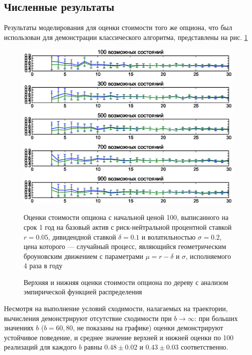 \documentclass[specialist,
               substylefile = spbu.rtx,
               subf,href,colorlinks=true, 12pt]{disser}
\begin{document}
	        \subsection{Численные результаты}
	            Результаты моделирования для оценки стоимости того же опциона, что был использован для демонстрации классического алгоритма, представлены на рис. \ref{fig:true_value_test_finite_grid}
                \begin{figure}[h]
                    \centering
                    \includegraphics[width=\textwidth]{true_value_test_finite_grid}
                    \caption{Верхняя и нижняя оценки стоимости опциона по дереву с анализом эмпирической функцией распределения}
                    \label{fig:true_value_test_finite_grid}
                    \footnotesize{Оценки стоимости опциона с начальной ценой 100, выписанного на срок 1 год на базовый актив с риск-нейтральной процентной ставкой $r = 0.05$, дивидендной ставкой $\delta = 0.1$ и волатильностью $\sigma=0.2$, цена которого --- случайный процесс, являющийся геометрическим броуновским движением с параметрами $\mu = r - \delta$ и $\sigma$, исполняемого 4 раза в году}
                \end{figure}
                Несмотря на выполнение условий сходимости, налагаемых на траектории, вычисления демонстрируют отсутствие сходимости при $b \to \infty$: при больших значениях $b$ ($b=60, 80$, не показаны на графике) оценки демонстрируют устойчивое поведение, и среднее значение верхней и нижней оценки по 100 реализаций для каждого $b$ равны $0.48\pm 0.02$ и $0.43\pm 0.03$ соответственно.
\end{document}
